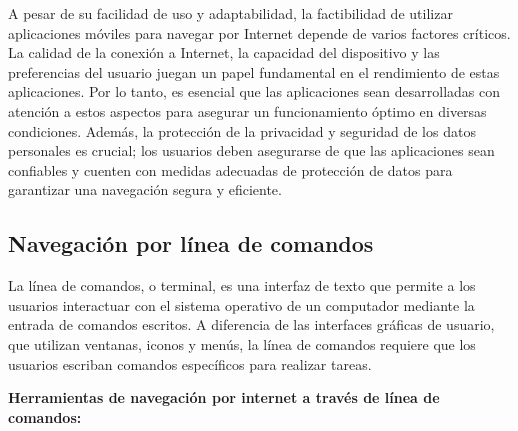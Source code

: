 \documentclass[12pt]{article}
\begin{document}
                        A pesar de su facilidad de uso y adaptabilidad, la factibilidad de utilizar aplicaciones móviles para navegar por Internet depende de varios factores críticos. La calidad de la conexión a Internet, la capacidad del dispositivo y las preferencias del usuario juegan un papel fundamental en el rendimiento de estas aplicaciones. Por lo tanto, es esencial que las aplicaciones sean desarrolladas con atención a estos aspectos para asegurar un funcionamiento óptimo en diversas condiciones. Además, la protección de la privacidad y seguridad de los datos personales es crucial; los usuarios deben asegurarse de que las aplicaciones sean confiables y cuenten con medidas adecuadas de protección de datos para garantizar una navegación segura y eficiente.


                \subsection{Navegación por línea de comandos}
                        La línea de comandos, o terminal, es una interfaz de texto que permite a los usuarios interactuar con el sistema operativo de un computador mediante la entrada de comandos escritos. A diferencia de las interfaces gráficas de usuario, que utilizan ventanas, iconos y menús, la línea de comandos requiere que los usuarios escriban comandos específicos para realizar tareas.
                        
                        \textbf{Herramientas de navegación por internet a través de línea de comandos:}
\end{document}
